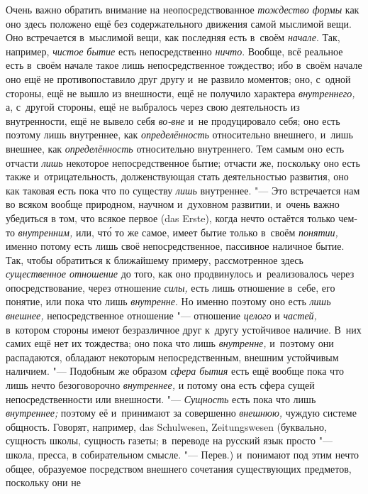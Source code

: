 Очень важно обратить внимание на неопосредствованное
{\em тождество формы} как оно здесь положено ещё без
содержательного движения самой мыслимой вещи. Оно встречается в~мыслимой
вещи, как последняя есть в~своём {\em начале}. Так,
например, {\em чистое бытие} есть непосредственно
{\em ничто}. Вообще, всё реальное есть в~своём начале
такое лишь непосредственное тождество; ибо в~своём начале оно ещё не
противопоставило друг другу и~не развило моментов; оно, с~одной стороны,
ещё не вышло из внешности, ещё не получило характера
{\em внутреннего,} а, с~другой стороны, ещё не
выбралось через свою деятельность из внутренности, ещё не вывело себя
{\em во-вне} и~не продуцировало себя; оно есть поэтому
лишь внутреннее, как {\em определённость} относительно
внешнего, и~лишь внешнее, как {\em определённость}
относительно внутреннего. Тем самым оно есть отчасти
{\em лишь} некоторое непосредственное бытие; отчасти
же, поскольку оно есть также и~отрицательность, долженствующая стать
деятельностью развития, оно как таковая есть пока что по существу
{\em лишь} внутреннее. "--- Это встречается нам во всяком
вообще природном, научном и~духовном развитии, и~очень важно убедиться в
том, что всякое первое (das Erste), когда нечто остаётся только чем-то
{\em внутренним,} или, чт\'{о} то же самое, имеет бытие
только в~своём {\em понятии,} именно потому есть лишь
своё непосредственное, пассивное наличное бытие. Так, чтобы обратиться к
ближайшему примеру, рассмотренное здесь
{\em существенное отношение} до того, как оно
продвинулось и~реализовалось через опосредствование, через отношение
{\em силы,} есть лишь отношение в~себе, его понятие,
или пока что лишь {\em внутренне}. Но именно поэтому
оно есть {\em лишь внешнее,} непосредственное отношение
"--- отношение {\em целого} и
{\em частей,} в~котором стороны имеют безразличное друг
к~другу устойчивое наличие. В~них самих ещё нет их тождества; оно пока что
лишь {\em внутренне,} и~поэтому они распадаются,
обладают некоторым непосредственным, внешним устойчивым наличием. "---
Подобным же образом {\em сфера бытия} есть ещё вообще
пока что лишь нечто безоговорочно {\em внутреннее,} и
потому она есть сфера сущей непосредственности или внешности. "---
{\em Сущность} есть пока что лишь
{\em внутреннее;} поэтому её и~принимают за совершенно
{\em внешнюю,} чуждую системе общность. Говорят,
например, das Schulwesen, Zeitungs\-wesen (буквально, сущность школы,
сущность газеты; в~переводе на русский язык просто "--- школа, пресса, в
собирательном смысле. "--- Перев.) и~понимают под этим нечто общее, образуемое
посредством внешнего сочетания существующих предметов, поскольку они не
